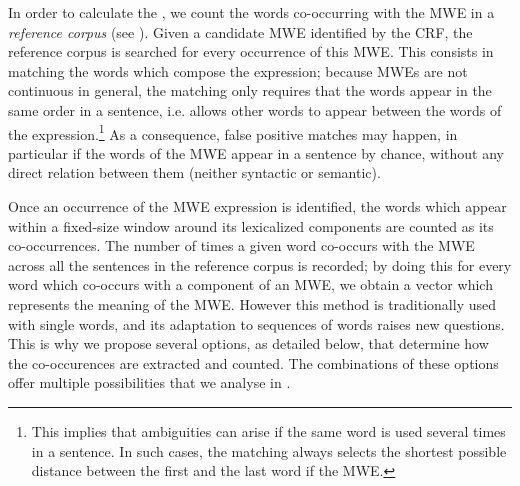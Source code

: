 \documentclass[output=paper
,modfonts
,nonflat]{langsci/langscibook}
\begin{document}
In order to calculate the , we count the words
co-occurring with the MWE in a {\em reference corpus} (see
). Given a candidate MWE identified by the CRF,
the reference corpus is searched for every occurrence of this
MWE. This consists in matching the words which compose the expression;
because MWEs are not continuous in general, the matching only requires
that the words appear in the same order in a sentence, i.e. allows
other words to appear between the words of the
expression.\footnote{This implies that ambiguities can arise if the
  same word is used several times in a sentence. In such cases, the
  matching always selects the shortest possible distance between the
  first and the last word if the MWE.}  As a consequence, false
positive matches may happen, in particular if the words of the MWE
appear in a sentence by chance, without any direct relation between
them (neither syntactic or semantic).

Once an occurrence of the MWE expression is identified, the words
which appear within a fixed-size window around its lexicalized
components are counted as its co-occurrences. The number of times a
given word co-occurs with the MWE across all the sentences in the
reference corpus is recorded; by doing this for every word which
co-occurs with a component of an MWE, we obtain a vector which
represents the meaning of the MWE. However this
method is traditionally used with single words, and its adaptation to
sequences of words raises new questions. This is why we propose
several options, as detailed below, that determine how the
co-occurences are extracted and counted. The combinations of these
options offer multiple possibilities that we analyse in
.
\end{document}
